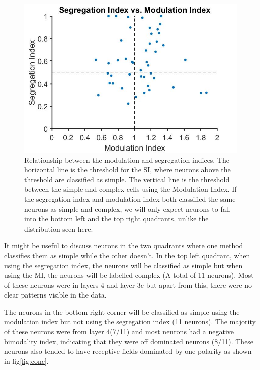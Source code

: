 	
	\begin{figure}[H]
		
		\includegraphics[width=\linewidth]{LinearV1/Segindvsmodind.jpg}
		\caption{Relationship between the modulation and segregation indices. The horizontal line is the threshold for the SI, where neurons above the threshold are classified as simple. The vertical line is the threshold between the simple and complex cells using the Modulation Index. If the segregation index and modulation index both classified the same neurons as simple and complex, we will only expect neurons to fall into the bottom left and the top right quadrants, unlike the distribution seen here.}
		\label{fig:fig5}
	\end{figure}

	It might be useful to discuss neurons in the two quadrants where one method classifies them as simple while the other doesn't. In the top left quadrant, when using the segregation index, the neurons will be classified as simple but when using the MI, the neurons will be labelled complex (A total of 11 neurons). Most of these neurons were in layers 4 and layer 3c but apart from this, there were no clear patterns visible in the data.
	
	The neurons in the bottom right corner will be classified as simple using the modulation index but not using the segregation index (11 neurons). The majority of these neurons were from layer 4(7/11) and most neurons had a negative bimodality index, indicating that they were off dominated neurons (8/11). These neurons also tended to have receptive fields dominated by one polarity as shown in fig\ref{fig:conc}.
	
